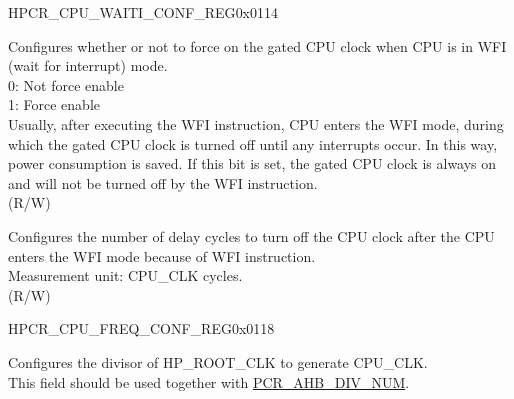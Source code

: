\begin{register}{H}{PCR\_CPU\_WAITI\_CONF\_REG}{0x0114}\label{regdesc:PCRCPUWAITICONFREG}
%
%
%
%
\regnewline%
\begin{regdesc}\begin{reglist}
\label{fielddesc:PCRCPUWAITMODEFORCEON}\item [PCR\_CPU\_WAIT\_MODE\_FORCE\_ON] Configures whether or not to force on the gated CPU clock when CPU is in WFI (wait for interrupt) mode.\\
0: Not force enable\\
1: Force enable\\
Usually, after executing the WFI instruction, CPU enters the WFI mode, during which the gated CPU clock is turned off until any interrupts occur. In this way, power consumption is saved. If this bit is set, the gated CPU clock is always on and will not be turned off by the WFI instruction.\\(R/W)
\label{fielddesc:PCRCPUWAITIDELAYNUM}\item [PCR\_CPU\_WAITI\_DELAY\_NUM] Configures the number of delay cycles to turn off the CPU clock after the CPU enters the WFI mode because of WFI instruction.\\
Measurement unit: CPU\_CLK cycles.\\ (R/W)
\end{reglist}\end{regdesc}
\end{register}


\begin{register}{H}{PCR\_CPU\_FREQ\_CONF\_REG}{0x0118}\label{regdesc:PCRCPUFREQCONFREG}
%
%
\regnewline%
\begin{regdesc}\begin{reglist}
\label{fielddesc:PCRCPUDIVNUM}\item [PCR\_CPU\_DIV\_NUM] Configures the divisor of HP\_ROOT\_CLK to generate CPU\_CLK.\\
This field should be used together with \hyperref[fielddesc:PCRAHBDIVNUM]{PCR\_AHB\_DIV\_NUM}.\\
\end{reglist}\end{regdesc}
\end{register}


